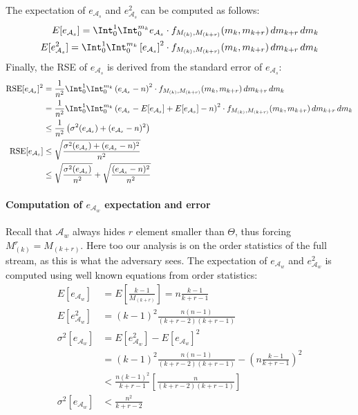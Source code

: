 The expectation of $e_{{\mathcal{A}}_s}$ and $e_{{\mathcal{A}}_s}^2$ can be computed as follows:
\begin{equation}
    \begin{split}
    E[e_{{\mathcal{A}}_s}] = \Int_{0}^{1} \Int_{0}^{m_k} e_{{\mathcal{A}}_s} \cdot f_{M_{(k)},M_{(k+r)}}(m_k,m_{k+r}) \,dm_{k+r}\,dm_k \\
    E[e_{{\mathcal{A}}_s}^2] = \Int_{0}^{1} \Int_{0}^{m_k} \left[e_{{\mathcal{A}}_s} \right] ^2 \cdot f_{M_{(k)},M_{(k+r)}}(m_k,m_{k+r}) \,dm_{k+r}\,dm_k
    \end{split}
    \label{eq:strong-expectation}
\end{equation}
Finally, the RSE of $e_{{\mathcal{A}}_s}$ is derived from the standard error of $e_{{\mathcal{A}}_s}$:
\begin{equation}
    \begin{split}
    \text{RSE}[e_{{\mathcal{A}}_s}]^2 &= \frac{1}{n^2}\Int_{0}^{1} \Int_{0}^{m_k} \left( e_{{\mathcal{A}}_s} - n \right)^2 \cdot f_{M_{(k)},M_{(k+r)}}(m_k,m_{k+r}) \,dm_{k+r}\,dm_k \\
    &= \frac{1}{n^2} \Int_{0}^{1} \Int_{0}^{m_k} \left( e_{{\mathcal{A}}_s} -E[e_{{\mathcal{A}}_s}] + E[e_{{\mathcal{A}}_s}] - n \right)^2 \cdot f_{M_{(k)},M_{(k+r)}}(m_k,m_{k+r}) \,dm_{k+r}\,dm_k \\
    &\leq \frac{1}{n^2} \left(\sigma^2(e_{{\mathcal{A}}_s}) + (e_{{\mathcal{A}}_s} - n)^2 \right)\\
    \text{RSE}[e_{{\mathcal{A}}_s}] &\leq \sqrt{\frac{\sigma^2(e_{{\mathcal{A}}_s}) + (e_{{\mathcal{A}}_s} - n)^2}{n^2}} \\
    &\leq \sqrt{\frac{\sigma^2(e_{{\mathcal{A}}_s})}{n^2}} + \sqrt{\frac{(e_{{\mathcal{A}}_s} - n)^2}{n^2}}
    \end{split}
    \label{eq:strong-se-bound}
\end{equation}


\paragraph{Computation of $e_{{\mathcal{A}}_w}$ expectation and error} Recall that ${\mathcal{A}}_w$ always hides $r$ element smaller than $\Theta$, thus
forcing $M^r_{(k)}=M_{(k+r)}$. Here too our analysis is on the order statistics of the full stream, as this is what the adversary sees.
The expectation of $e_{{\mathcal{A}}_w}$ and $e_{{\mathcal{A}}_w}^2$ is computed using well known equations from order statistics:
\begin{align*}
    E[e_{{\mathcal{A}}_w}]&=E\left[ \frac{k-1}{M_{(k+r)}} \right]=n\frac{k-1}{k+r-1} \\
    E[e_{{\mathcal{A}}_w}^2]&=(k-1)^2\frac{n(n-1)}{(k+r-2)(k+r-1)} \\
    \sigma^2[e_{{\mathcal{A}}_w}] &= E[e_{{\mathcal{A}}_w}^2] - E[e_{{\mathcal{A}}_w}]^2 \\
    &=(k-1)^2\frac{n(n-1)}{(k+r-2)(k+r-1)} - \left(n\frac{k-1}{k+r-1} \right)^2 \\
    &< \frac{n(k-1)^2}{k+r-1}\left[\frac{n}{(k+r-2)(k+r-1)}\right] \\
    \sigma^2[e_{{\mathcal{A}}_w}] &< \frac{n^2}{k+r-2}
\end{align*}

